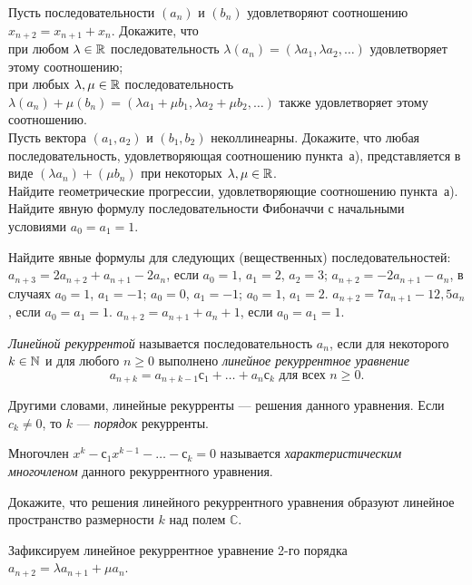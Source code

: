 \documentclass[a4paper,12pt]{article}
\begin{document}
	

 Пусть последовательности
$(a_n)$ и $(b_n)$ удовлетворяют соотношению $x_{n + 2} = x_{n + 1} + x_n$.
Докажите, что \\
 при любом $\lambda\in\mathbb{R}$ последовательность
$\lambda (a_n) = (\lambda a_1,\lambda a_2,\dots)$
удовлетворяет этому соотношению; \\
 при любых $\lambda,\mu \in\mathbb{R}$ последовательность $\lambda(a_n)
+ \mu(b_n) = (\lambda a_1 + \mu b_1,\lambda a_2 + \mu b_2,\dots)$
также удовлетворяет этому соотношению.\\
 Пусть вектора $(a_1,a_2)$ и $(b_1,b_2)$ неколлинеарны.
Докажите, что любая последовательность, удовлетворяющая соотношению
пункта~а), представляется в виде $(\lambda a_n) +
(\mu b_n)$ при некоторых $\lambda,\mu \in \mathbb{R}$.\\
 Найдите
геометрические прогрессии,  удовлетворяющие соотношению пункта~а).\\
 Найдите явную формулу последовательности Фибоначчи с
начальными условиями $a_0 = a_1 = 1$. 

 Найдите явные формулы для следующих (вещественных)
последовательностей:   $a_{n + 3} = 2a_{n + 2} +
a_{n + 1} - 2a_n$, если $a_0 = 1$, $a_1 = 2$, $a_2 = 3$; 
$a_{n + 2} = -2a_{n + 1} - a_n$, в случаях $a_0 = 1$, $a_1 = -1$;
$a_0 = 0$, $a_1 = -1$; $a_0 = 1$, $a_1 = 2$.  $a_{n + 2} =
7a_{n + 1} - 12{,}5a_n$, если $a_0 = a_1 = 1$.  $a_{n + 2} =
a_{n + 1} + a_n + 1$, если $a_0 = a_1 = 1$. 


 {\it Линейной рекуррентой} называется последовательность $a_n$, если для некоторого $k \in \mathbb{N}$
и для любого $n \geqslant 0$ выполнено {\it линейное рекуррентное уравнение}
$$a_{n+k} = a_{n+k-1}с_1+ \ldots + a_{n}с_k \mbox{ для всех } n \geqslant 0.$$

Другими словами, линейные рекурренты --- решения данного уравнения. Если $c_k \neq 0$, то $k$ --- {\it порядок} рекурренты.

Многочлен $x^k - с_1  x^{k-1} - \ldots - с_k=0$ называется \textit{характеристическим многочленом} данного рекуррентного уравнения.

 Докажите, что решения линейного рекуррентного уравнения образуют линейное пространство размерности $k$ над полем $\mathbb{C}$.

 Зафиксируем линейное рекуррентное уравнение 2-го порядка $a_{n+2} = \lambda a_{n+1} + \mu a_n$.
\end{document}
